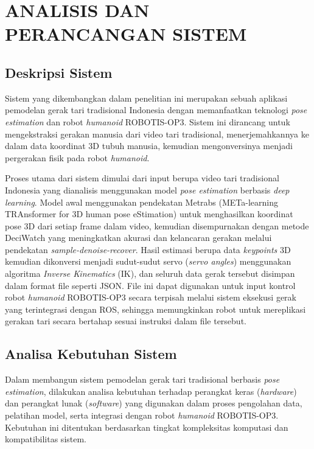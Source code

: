 \chapter{ANALISIS DAN PERANCANGAN SISTEM}
\vspace{1em}

\section{Deskripsi Sistem}
Sistem yang dikembangkan dalam penelitian ini merupakan sebuah aplikasi pemodelan gerak tari tradisional Indonesia dengan memanfaatkan teknologi \textit{pose estimation} dan robot \textit{humanoid} ROBOTIS-OP3. Sistem ini dirancang untuk mengekstraksi gerakan manusia dari video tari tradisional, menerjemahkannya ke dalam data koordinat 3D tubuh manusia, kemudian mengonversinya menjadi pergerakan fisik pada robot \textit{humanoid}.

Proses utama dari sistem dimulai dari input berupa video tari tradisional Indonesia yang dianalisis menggunakan model \textit{pose estimation} berbasis \textit{deep learning}. Model awal menggunakan pendekatan Metrabs (METa-learning TRAnsformer for 3D human pose eStimation) untuk menghasilkan koordinat pose 3D dari setiap frame dalam video, kemudian disempurnakan dengan metode DeciWatch yang meningkatkan akurasi dan kelancaran gerakan melalui pendekatan \textit{sample-denoise-recover}. Hasil estimasi berupa data \textit{keypoints} 3D kemudian dikonversi menjadi sudut-sudut servo (\textit{servo angles}) menggunakan algoritma \textit{Inverse Kinematics} (IK), dan seluruh data gerak tersebut disimpan dalam format file seperti JSON. File ini dapat digunakan untuk input kontrol robot \textit{humanoid} ROBOTIS-OP3 secara terpisah melalui sistem eksekusi gerak yang terintegrasi dengan ROS, sehingga memungkinkan robot untuk mereplikasi gerakan tari secara bertahap sesuai instruksi dalam file tersebut.

\section{Analisa Kebutuhan Sistem}

Dalam membangun sistem pemodelan gerak tari tradisional berbasis \textit{pose estimation}, dilakukan analisa kebutuhan terhadap perangkat keras (\textit{hardware}) dan perangkat lunak (\textit{software}) yang digunakan dalam proses pengolahan data, pelatihan model, serta integrasi dengan robot \textit{humanoid} ROBOTIS-OP3. Kebutuhan ini ditentukan berdasarkan tingkat kompleksitas komputasi dan kompatibilitas sistem.

